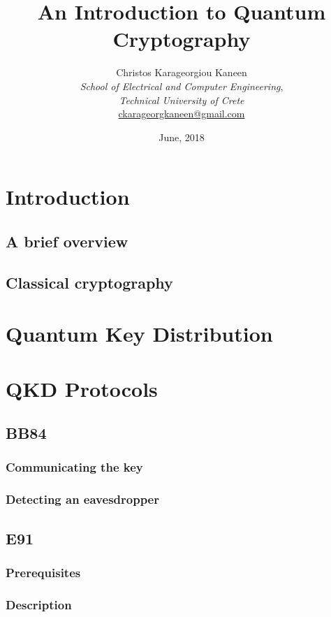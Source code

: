 \documentclass[12pt]{article}
\title{\textbf{An Introduction to Quantum Cryptography}}
\author{{\large Christos Karageorgiou Kaneen}
    \vspace{0.3in}\\
    \emph {School of Electrical and Computer Engineering},\\
    \emph {Technical University of Crete}
    \vspace{0.1in}\\
    \href{mailto:ckarageorgkaneen@gmail.com}
    {ckarageorgkaneen@gmail.com}}
\date{June, 2018}
\def\texinput#1{}
\begin{document}
\maketitle

\begin{abstract}
	\texinput{abstract}
\end{abstract}
\newpage

\tableofcontents
\newpage

\section{Introduction}
    \subsection{A brief overview}
        \texinput{a_brief_overview}
    \newpage
    \subsection{Classical cryptography}
        \texinput{classical_cryptography}
    \newpage
\section{Quantum Key Distribution}
    \texinput{quantum_key_distribution}
\newpage
\section{QKD Protocols}
    \subsection{BB84}
        \subsubsection{Communicating the key}
            \texinput{bb84_communicating_the_key}
        \newpage
        \subsubsection{Detecting an eavesdropper}
            \texinput{bb84_detecting_an_eavesdropper}
        \newpage
    \subsection{E91}
        \subsubsection{Prerequisites}
            \texinput{e91_prerequisites}
        \newpage
        \subsubsection{Description}
            \texinput{e91_description}
        \newpage
\end{document}
